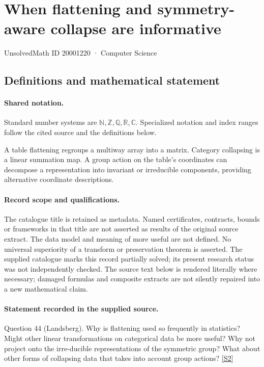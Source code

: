 \documentclass[11pt]{article}
\newcommand{\sref}[2]{\hyperlink{source:#1:#2}{[S#2]}}
\begin{document}
\setcounter{section}{20001219}
\section{When flattening and symmetry-aware collapse are informative}\label{20001220}
{\small\sffamily UnsolvedMath ID 20001220 · Computer Science}
\subsection{Definitions and mathematical statement}

\paragraph{Shared notation.}Standard number systems are $\mathbb N,\mathbb Z,\mathbb Q,\mathbb R,\mathbb C$. Specialized notation and index ranges follow the cited source and the definitions below.


A table flattening regroups a multiway array into a matrix. Category collapsing is a linear summation map. A group action on the table's coordinates can decompose a representation into invariant or irreducible components, providing alternative coordinate descriptions.
\paragraph{Record scope and qualifications.}
The catalogue title is retained as metadata. Named certificates, contracts, bounds or frameworks in that title are not asserted as results of the original source extract.
The data model and meaning of more useful are not defined. No universal superiority of a transform or preservation theorem is asserted. The supplied catalogue marks this record partially solved; its present research status was not independently checked.
The source text below is rendered literally where necessary; damaged formulas and composite extracts are not silently repaired into a new mathematical claim.
\paragraph{Statement recorded in the supplied source.}
Question 44 (Landsberg). Why is flattening used so frequently in statistics? Might other linear transformations on categorical data be more useful? Why not project onto the irre-ducible representations of the symmetric group? What about other forms of collapsing data that takes into account group actions? \sref{20001220}{2}
\end{document}
